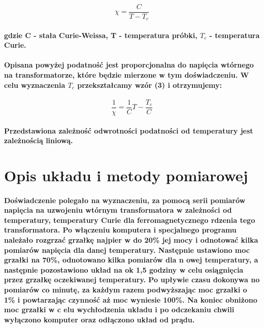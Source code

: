 \documentclass[a4paper,10pt]{article}
\begin{document}
\begin{equation}
\chi = \frac{C}{T - T_c}
\end{equation}

\paragraph{gdzie C - stała Curie-Weissa, T - temperatura próbki, $T_c$ - temperatura Curie.}

\paragraph{Opisana powyżej podatność jest proporcjonalna do napięcia wtórnego na transformatorze, które będzie mierzone w tym doświadczeniu. W celu wyznaczenia $T_c$ przekształcamy wzór (3) i otrzymujemy:}

\begin{equation}
\frac{1}{\chi} = \frac{1}{C} T - \frac{T_c}{C}
\end{equation}

\paragraph{Przedstawiona zależność odwrotności podatności od temperatury jest zależnością liniową.}

\section{Opis układu i metody pomiarowej}
\paragraph{Doświadczenie polegało na wyznaczeniu, za pomocą serii pomiarów napięcia na uzwojeniu wtórnym transformatora w zależności od temperatury,
temperatury Curie dla ferromagnetycznego rdzenia tego transformatora. Po włączeniu komputera i specjalnego programu należało rozgrzać grzałkę najpier
w do 20\% jej mocy i odnotować kilka pomiarów napięcia dla danej temperatury. Następnie ustawiono moc grzałki na 70\%, odnotowano kilka pomiarów dla n
owej temperatury, a następnie pozostawiono układ na ok 1,5 godziny w celu osiągnięcia przez grzałkę oczekiwanej temperatury. Po upływie czasu dokonywa
no pomiarów co minutę, za każdym razem podwyższając moc grzałki o 1\% i powtarzając czynność aż moc wyniesie 100\%. Na koniec obniżono moc grzałki w c
elu wychłodzenia układu i po odczekaniu chwili wyłączono komputer oraz odłączono układ od prądu.\\}
\end{document}

